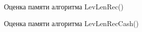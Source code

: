 \begin{figure}
	\caption{Оценка памяти алгоритма LevLenRec()}
\end{figure}

\begin{figure}
	\caption{Оценка памяти алгоритма LevLenRecCash()}
\end{figure}

